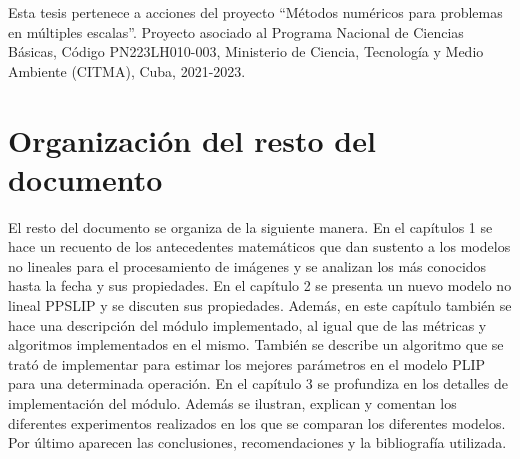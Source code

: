 Esta tesis pertenece a acciones del proyecto ``Métodos numéricos para problemas en múltiples escalas''. Proyecto asociado al Programa Nacional de Ciencias Básicas, Código PN223LH010-003, Ministerio de Ciencia, Tecnología y Medio Ambiente (CITMA), Cuba, 2021-2023.

\section*{Organizaci\'on del resto del documento}

El resto del documento se organiza de la siguiente manera. En el cap\'itulos 1 se hace un recuento de los antecedentes matem\'aticos que dan sustento a los modelos no lineales para el procesamiento de im\'agenes y se analizan los m\'as conocidos hasta la fecha y sus propiedades. En el cap\'itulo 2 se presenta un nuevo modelo no lineal PPSLIP y se discuten sus propiedades. Adem\'as, en este cap\'itulo tambi\'en se hace una descripci\'on del m\'odulo implementado, al igual que de las m\'etricas y algoritmos implementados en el mismo. Tambi\'en se describe un algoritmo que se trat\'o de implementar para estimar los mejores par\'ametros en el modelo PLIP para una determinada operaci\'on. En el cap\'itulo 3 se profundiza en los detalles de implementaci\'on del m\'odulo. Adem\'as se ilustran, explican y comentan los diferentes experimentos realizados en los que se comparan los diferentes modelos. Por \'ultimo aparecen las conclusiones, recomendaciones y la bibliograf\'ia utilizada.